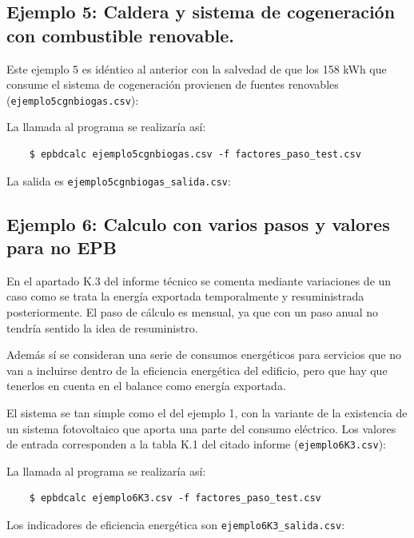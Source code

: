 \documentclass[10pt,notitlepage,oneside,a4paper]{article}
\begin{document}
\subsection{Ejemplo 5: Caldera y sistema de cogeneración con combustible renovable.}
Este ejemplo 5 es idéntico al anterior con la salvedad de que los 158 kWh que consume el sistema de cogeneración provienen de fuentes renovables (\texttt{ejemplo5cgnbiogas.csv}):


La llamada al programa se realizaría así:

\begin{verbatim}
    $ epbdcalc ejemplo5cgnbiogas.csv -f factores_paso_test.csv
\end{verbatim}

La salida es \texttt{ejemplo5cgnbiogas\_salida.csv}:



\subsection{Ejemplo 6: Calculo con varios pasos y valores para no EPB}
En el apartado K.3 del informe técnico se comenta mediante variaciones de un caso como se trata la energía exportada temporalmente y resuministrada posteriormente. El paso de cálculo es mensual, ya que con un paso anual no tendría sentido la idea de resuministro.

Además sí se consideran una serie de consumos energéticos para servicios que no van a incluirse dentro de la eficiencia energética del edificio, pero que hay que tenerlos en cuenta en el balance como energía exportada. 

El sistema se tan simple como el del ejemplo 1, con la variante de la existencia de un sistema fotovoltaico que aporta una parte del consumo eléctrico. Los valores de entrada corresponden a la tabla K.1 del citado informe (\texttt{ejemplo6K3.csv}):


La llamada al programa se realizaría así:

\begin{verbatim}
    $ epbdcalc ejemplo6K3.csv -f factores_paso_test.csv
\end{verbatim}

Los indicadores de eficiencia energética son \texttt{ejemplo6K3\_salida.csv}:

\end{document}
